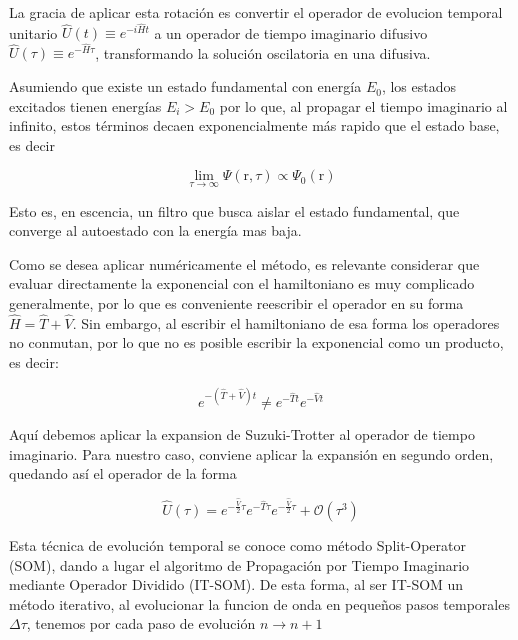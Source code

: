 \documentclass[aps,twocolumn,preprintnumbers]{revtex4}
\begin{document}
  La gracia de aplicar esta rotación es convertir el operador de evolucion temporal unitario $\hat{U}(t) \equiv e^{-i\hat{H}t}$ a un operador de tiempo imaginario difusivo $\hat{U}(\tau) \equiv e^{-\hat{H}\tau}$, transformando la solución oscilatoria en una difusiva.

  Asumiendo que existe un estado fundamental con energía $E_0$, los estados excitados tienen energías $E_i > E_0$ por lo que, al propagar el tiempo imaginario al infinito, estos términos decaen exponencialmente más rapido que el estado base, es decir

  \begin{equation}
    \lim_{\tau \to \infty} \Psi(\bm{\mathrm{r}}, \tau) \propto \Psi_0(\bm{\mathrm{r}})
  \end{equation}

  Esto es, en escencia, un filtro que busca aislar el estado fundamental, que converge al autoestado con la energía mas baja.

  Como se desea aplicar numéricamente el método, es relevante considerar que evaluar directamente la exponencial con el hamiltoniano es muy complicado generalmente, por lo que es conveniente reescribir el operador en su forma $\hat{H} = \hat{T} + \hat{V}$. Sin embargo, al escribir el hamiltoniano de esa forma los operadores no conmutan, por lo que no es posible escribir la exponencial como un producto, es decir:

  \begin{equation}
    e^{-(\hat{T} + \hat{V})t} \neq e^{-\hat{T}t}e^{-\hat{V}t}
  \end{equation}

  Aquí debemos aplicar la expansion de Suzuki-Trotter \cite{hatano_suzuki} al operador de tiempo imaginario. Para nuestro caso, conviene aplicar la expansión en segundo orden, quedando así el operador de la forma

  \begin{equation}
    \hat{U}(\tau) = e^{-\frac{\hat{V}}{2}\tau}e^{-\hat{T}\tau}e^{-\frac{\hat{V}}{2}\tau} + \mathcal{O}(\tau^3)
  \end{equation}

  Esta técnica de evolución temporal se conoce como método Split-Operator (SOM), dando a lugar el algoritmo de Propagación por Tiempo Imaginario mediante Operador Dividido (IT-SOM). De esta forma, al ser IT-SOM un método iterativo, al evolucionar la funcion de onda en pequeños pasos temporales $\Delta\tau$, tenemos por cada paso de evolución $n\to n+1$
\end{document}
